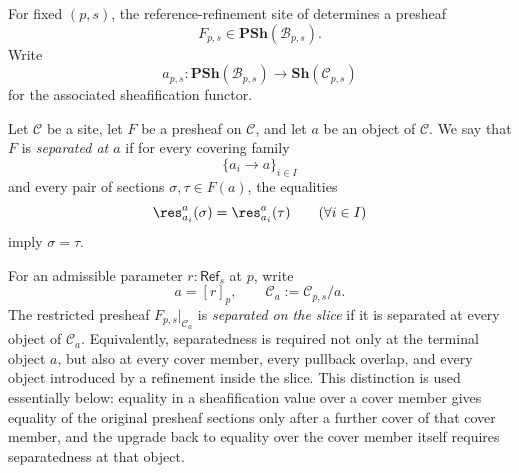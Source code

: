 For fixed $(p,s)$, the reference-refinement site of  determines a presheaf
\[
F_{p,s}\in\mathbf{PSh}(\mathcal{B}_{p,s}).
\]
Write
\[
a_{p,s}:\mathbf{PSh}(\mathcal{B}_{p,s})\to\mathbf{Sh}(\mathcal{C}_{p,s})
\]
for the associated sheafification functor.

\begin{definition}\label{def:separated-at-a}
Let $\mathcal C$ be a site, let $F$ be a presheaf on $\mathcal C$, and let $a$ be an object of $\mathcal C$. We say that $F$ is \emph{separated at $a$} if for every covering family
\[
\{a_i\to a\}_{i\in I}
\]
and every pair of sections $\sigma,\tau\in F(a)$, the equalities
\[
\res_{a_i}^{a}(\sigma)=\res_{a_i}^{a}(\tau)
\qquad
(\forall i\in I)
\]
imply $\sigma=\tau$.
\end{definition}

\begin{definition}\label{def:separated-restriction}
For an admissible parameter $r:\mathsf{Ref}_s$ at $p$, write
\[
a=[r]_p,
\qquad
\mathcal C_a:=\mathcal C_{p,s}/a.
\]
The restricted presheaf $F_{p,s}|_{\mathcal C_a}$ is \emph{separated on the slice} if it is separated at every object of $\mathcal C_a$.
Equivalently, separatedness is required not only at the terminal object
$a$, but also at every cover member, every pullback overlap, and every
object introduced by a refinement inside the slice. This distinction is
used essentially below: equality in a sheafification value over a cover
member gives equality of the original presheaf sections only after a
further cover of that cover member, and the upgrade back to equality over
the cover member itself requires separatedness at that object.
\end{definition}

